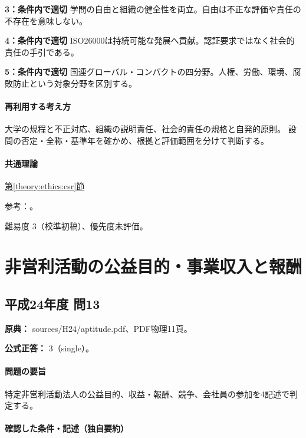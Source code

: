 \noindent\textbf{3：条件内で適切} 学問の自由と組織の健全性を両立。自由は不正な評価や責任の不存在を意味しない。\par

\noindent\textbf{4：条件内で適切} ISO26000は持続可能な発展へ貢献。認証要求ではなく社会的責任の手引である。\par

\noindent\textbf{5：条件内で適切} 国連グローバル・コンパクトの四分野。人権、労働、環境、腐敗防止という対象分野を区別する。\par

\paragraph{再利用する考え方} 大学の規程と不正対応、組織の説明責任、社会的責任の規格と自発的原則。 設問の否定・全称・基準年を確かめ、根拠と評価範囲を分けて判断する。

\paragraph{共通理論} \hyperref[theory:ethics:csr]{第\ref*{theory:ethics:csr}節}

\par 参考：\cite{iso26000,eth54_globalcompact,eth54_university}。

\par 難易度 3（校準初稿）、優先度未評価。

\section{非営利活動の公益目的・事業収入と報酬}

\subsection{平成24年度 問13}
\label{q:h24-reg-apt-13}

\noindent\textbf{原典：} sources/H24/aptitude.pdf、PDF物理11頁。

\textbf{公式正答：} 3（single）。

\paragraph{問題の要旨} 特定非営利活動法人の公益目的、収益・報酬、競争、会社員の参加を4記述で判定する。

\paragraph{確認した条件・記述（独自要約）}\mbox{}\par

